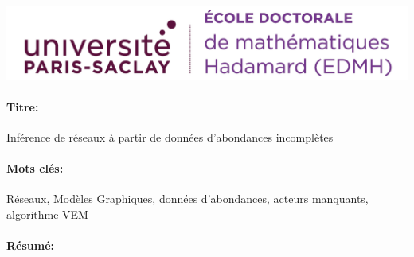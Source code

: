 \ifthispageodd{\newpage\thispagestyle{empty}\null\newpage}{}
\thispagestyle{empty}
\selectfont

\lhead{}
\rhead{}
\rfoot{}
\cfoot{}
\lfoot{}

\noindent 
\includegraphics[height=2.45cm]{e.png}
\vspace{1cm}

\begin{mdframed}[linecolor=Prune,linewidth=1]
\vspace{-.25cm}
\paragraph*{Titre:} Inférence de réseaux à partir de données d'abondances incomplètes


\begin{small}
\vspace{-.25cm}
\paragraph*{Mots clés:} Réseaux, Modèles Graphiques, données d'abondances, acteurs manquants, algorithme VEM

\vspace{-.5cm}
\begin{multicols}{2}
\paragraph*{Résumé:}  
\end{multicols}
\end{small}
\end{mdframed}

